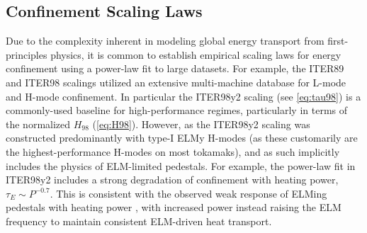 \begin{figure}
 \pushtooutside
\end{figure}

\subsection{Confinement Scaling Laws}\label{subsec:imode_powerlaws}

Due to the complexity inherent in modeling global energy transport from first-principles physics, it is common to establish empirical scaling laws for energy confinement using a power-law fit to large datasets.  For example, the ITER89 \cite{Yushmanov1990} and ITER98 \cite{ITER1999} scalings utilized an extensive multi-machine database \cite{Christiansen1992} for L-mode and H-mode confinement.  In particular the ITER98y2 scaling (see \cref{eq:tau98}) is a commonly-used baseline for high-performance regimes, particularly in terms of the normalized $H_{98}$ (\cref{eq:H98}).  However, as the ITER98y2 scaling was constructed predominantly with type-I ELMy H-modes (as these customarily are the highest-performance H-modes on most tokamaks), and as such implicitly includes the physics of ELM-limited pedestals.  For example, the power-law fit in ITER98y2 includes a strong degradation of confinement with heating power, $\tau_E \sim P^{-0.7}$.  This is consistent with the observed weak response of ELMing pedestals with heating power \cite{Snyder2007}, with increased power instead raising the ELM frequency to maintain consistent ELM-driven heat transport.

